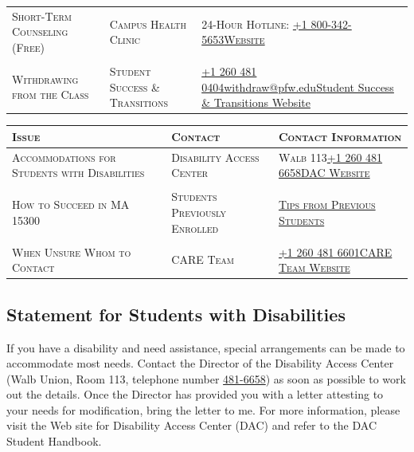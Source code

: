 \documentclass[letterpaper,twoside]{article}
\begin{document}
\begin{center}
\begin{tabularx}{\columnwidth}{lXX}
            \\
            \textsc{Short-Term Counseling (Free)} & \textsc{Campus Health Clinic} & \textsc{24-Hour Hotline:} \href{tel:18003425653}{+1 800-342-5653}\newline\href{https://www.bowencenter.org/scheduleappointment}{\textsc{Website}}\\
            \\
            \textsc{Withdrawing from the Class} & \textsc{Student Success \& Transitions} & \href{tel:12604810404}{+1 260 481 0404}\newline\href{mailto:withdraw@pfw.edu}{withdraw@pfw.edu}\newline\href{https://www.pfw.edu/sst}{Student Success \& Transitions Website}\\
        \end{tabularx}
        \newpage
        \begin{tabularx}{\columnwidth}{lXX}
            \textsc{Issue} & \textsc{Contact} & \textsc{Contact Information}\\
            \hline
            \textsc{Accommodations for Students with Disabilities} & \textsc{Disability Access Center} & \textsc{Walb 113}\newline\href{tel:12604816658}{+1 260 481 6658}\newline\href{https://www.pfw.edu/dac}{\textsc{DAC Website}}\\
            \\
            \textsc{How to Succeed in MA 15300} & \textsc{Students Previously Enrolled} & \href{https://users.pfw.edu/lamaster/ma153/SP21/tipstoyoufromPastMA153Students.htm}{\textsc{Tips from Previous Students}}\\
            \\
            \textsc{When Unsure Whom to Contact} & \textsc{CARE Team} & \href{tel:12604816601}{+1 260 481 6601}\newline\href{https://www.pfw.edu/offices/dean-of-students/about/care-team}{\textsc{CARE Team Website}}\\
        \end{tabularx}
    \end{center}
    \normalsize
    \subsection*{Statement for Students with Disabilities}
    If you have a disability and need assistance, special arrangements can be made to accommodate most needs.
    Contact the Director of the Disability Access Center (Walb Union, Room 113, telephone number \href{tel:12604816658}{481-6658}) as soon as possible to work out the details.
    Once the Director has provided you with a letter attesting to your needs for modification, bring the letter to me.
    For more information, please visit the Web site for Disability Access Center (DAC) and refer to the DAC Student Handbook.
\end{document}
